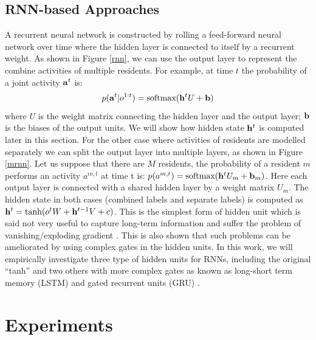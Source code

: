 \subsection{RNN-based Approaches}
A recurrent neural network is constructed by rolling a feed-forward
neural network over time where the hidden layer is connected to itself
by a recurrent weight. As shown in Figure \ref{rnn}, we can use the
output layer to represent the combine activities of multiple
residents. For example, at time $t$ the probability of a joint
activity $\mathbf{a}^{t}$ is:
\begin{equation}
  p(\mathbf{a}^{t}|o^{1:t}) = \text{softmax}(\mathbf{h}^{t}U + \mathbf{b})
\end{equation}
where $U$ is the weight matrix connecting the hidden layer and the
output layer; $\mathbf{b}$ is the biases of the output units. We will show
how hidden state $\mathbf{h}^{t}$ is computed later in this section. For
the other case where activities of residents are modelled separately
we can split the output layer into multiple layers, as shown in Figure
\ref{mrnn}. Let us suppose that there are $M$ residents, the
probability of a resident $m$ performs an activity $a^{m,t}$ at time t
is: $p(a^{m,t}) = \text{softmax}(\mathbf{h}^{t}U_m + \mathbf{b}_m)$. Here each
output layer is connected with a shared hidden layer by a weight
matrix $U_m$. The hidden state in both cases (combined labels and
separate labels) is computed as $\mathbf{h}^{t} =\tanh(o^{t}W +
\mathbf{h}^{t-1}V+ c)$. This is the simplest form of hidden unit which is
said not very useful to capture long-term information and suffer the
problem of vanishing/exploding gradient \cite{Hochreiter_1997}. This
is also shown that such problems can be ameliorated by using complex
gates in the hidden units. In this work, we will empirically
investigate three type of hidden units for RNNs, including the
original ``tanh'' and two others with more complex gates as known as
long-short term memory (LSTM) \cite{Hochreiter_1997} and gated
recurrent units (GRU) \cite{Cho_2014}.
\section{Experiments}
\label{sec:exp}
